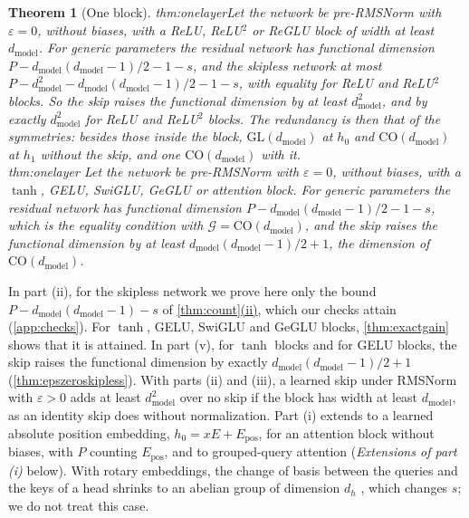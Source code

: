 \documentclass[10pt]{article}
\newtheorem{theorem}{Theorem}[section]
\theoremstyle{definition}
\theoremstyle{remark}
\newcommand{\dm}{d_{\mathrm{model}}}
\newcommand{\GL}{\mathrm{GL}}
\newcommand{\CO}{\mathrm{CO}}
\newcommand{\G}{\mathcal{G}}
\newcommand{\ptlabel}[1]{\phantomsection\label{#1}}
\DeclareRobustCommand{\cpref}[2]{\hyperref[#1:#2]{\cref*{#1}(#2)}}
\newcommand{\stpart}[3]{\ifx\relax#1\relax\else\ptlabel{#1:#2}\fi{\upshape\bfseries\boldmath(#2)\ifx\relax#3\relax\else\ #3.\fi}}
\begin{document}
\begin{theorem}[One block]
\stpart{thm:onelayer}{iv}{} Let the network be pre-RMSNorm with $\varepsilon = 0$, without biases, with a ReLU, ReLU$^2$ or ReGLU block of width at least $\dm$. For generic parameters the residual network has functional dimension $P - \dm(\dm-1)/2 - 1 - s$, and the skipless network at most $P - \dm^2 - \dm(\dm-1)/2 - 1 - s$, with equality for ReLU and ReLU$^2$ blocks. So the skip raises the functional dimension by at least $\dm^2$, and by exactly $\dm^2$ for ReLU and ReLU$^2$ blocks. The redundancy is then that of the symmetries: besides those inside the block, $\GL(\dm)$ at $h_0$ and $\CO(\dm)$ at $h_1$ without the skip, and one $\CO(\dm)$ with it.\\
\stpart{thm:onelayer}{v}{} Let the network be pre-RMSNorm with $\varepsilon = 0$, without biases, with a $\tanh$, GELU, SwiGLU, GeGLU or attention block. For generic parameters the residual network has functional dimension $P - \dm(\dm-1)/2 - 1 - s$, which is the equality condition with $\G = \CO(\dm)$, and the skip raises the functional dimension by at least $\dm(\dm-1)/2 + 1$, the dimension of $\CO(\dm)$.
\end{theorem}

In part (ii), for the skipless network we prove here only the bound $P - \dm(\dm-1) - s$ of \cpref{thm:count}{ii}, which our checks attain (\cref{app:checks}). For $\tanh$, GELU, SwiGLU and GeGLU blocks, \cref{thm:exactgain} shows that it is attained. In part (v), for $\tanh$ blocks and for GELU blocks, the skip raises the functional dimension by exactly $\dm(\dm-1)/2 + 1$ (\cref{thm:epszeroskipless}). With parts (ii) and (iii), a learned skip under RMSNorm with $\varepsilon > 0$ adds at least $\dm^2$ over no skip if the block has width at least $\dm$, as an identity skip does without normalization. Part (i) extends to a learned absolute position embedding, $h_0 = xE + E_{\mathrm{pos}}$, for an attention block without biases, with $P$ counting $E_{\mathrm{pos}}$, and to grouped-query attention (\emph{Extensions of part (i)} below). With rotary embeddings, the change of basis between the queries and the keys of a head shrinks to an abelian group of dimension $d_h$ \citep[Theorem~4.2]{tran2026equivalence}, which changes $s$; we do not treat this case.
\end{document}
